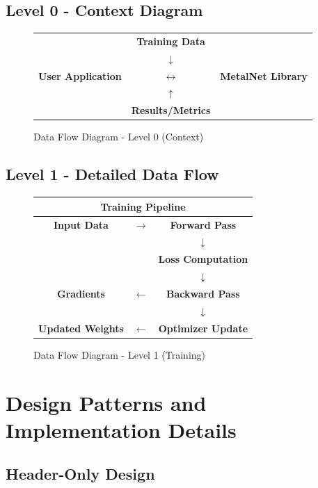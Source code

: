 \documentclass[12pt,oneside,a4paper]{report}
\begin{document}
\subsection{Level 0 - Context Diagram}

\begin{figure}[H]
\centering
\begin{tabular}{c|c|c}
& \textbf{Training Data} & \\
& $\downarrow$ & \\
\textbf{User Application} & $\leftrightarrow$ & \textbf{MetalNet Library} \\
& $\uparrow$ & \\
& \textbf{Results/Metrics} &
\end{tabular}
\caption{Data Flow Diagram - Level 0 (Context)}
\end{figure}

\subsection{Level 1 - Detailed Data Flow}

\begin{figure}[H]
\centering
\begin{tabular}{|c|c|c|}
\hline
\multicolumn{3}{|c|}{\textbf{Training Pipeline}} \\
\hline
\textbf{Input Data} & $\rightarrow$ & \textbf{Forward Pass} \\
& & $\downarrow$ \\
& & \textbf{Loss Computation} \\
& & $\downarrow$ \\
\textbf{Gradients} & $\leftarrow$ & \textbf{Backward Pass} \\
& & $\downarrow$ \\
\textbf{Updated Weights} & $\leftarrow$ & \textbf{Optimizer Update} \\
\hline
\end{tabular}
\caption{Data Flow Diagram - Level 1 (Training)}
\end{figure}

\section{Design Patterns and Implementation Details}

\subsection{Header-Only Design}
\end{document}
